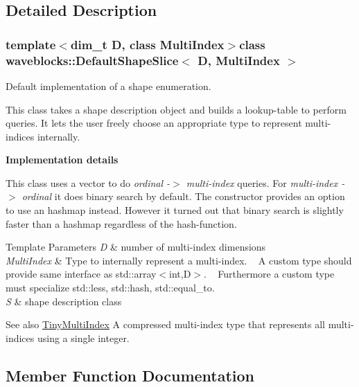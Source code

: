 \subsection{Detailed Description}
\subsubsection*{template$<$dim\+\_\+t D, class Multi\+Index$>$class waveblocks\+::\+Default\+Shape\+Slice$<$ D, Multi\+Index $>$}

Default implementation of a shape enumeration. 

This class takes a shape description object and builds a lookup-\/table to perform queries. It lets the user freely choose an appropriate type to represent multi-\/indices internally.

{\bfseries Implementation details}

This class uses a vector to do {\itshape ordinal -\/$>$ multi-\/index} queries. For {\itshape multi-\/index -\/$>$ ordinal} it does binary search by default. The constructor provides an option to use an hashmap instead. However it turned out that binary search is slightly faster than a hashmap regardless of the hash-\/function.


\begin{DoxyTemplParams}{Template Parameters}
{\em D} & number of multi-\/index dimensions \\
\hline
{\em Multi\+Index} & Type to internally represent a multi-\/index. ~\newline
 A custom type should provide same interface as std\+::array$<$int,\+D$>$. ~\newline
 Furthermore a custom type must specialize std\+::less, std\+::hash, std\+::equal\+\_\+to. \\
\hline
{\em S} & shape description class\\
\hline
\end{DoxyTemplParams}
\begin{DoxySeeAlso}{See also}
\hyperlink{classwaveblocks_1_1_tiny_multi_index}{Tiny\+Multi\+Index} A compressed multi-\/index type that represents all multi-\/indices using a single integer. 
\end{DoxySeeAlso}


\subsection{Member Function Documentation}
\hypertarget{classwaveblocks_1_1_default_shape_slice_ae44dd6209de700b5a370f3815979b883}{}

